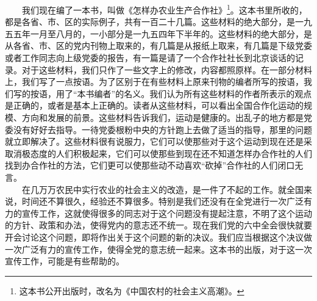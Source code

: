 \documentclass[cn,11pt,chinese]{elegantbook}
\begin{document}
　　我们现在编了一本书，叫做《怎样办农业生产合作社》\footnote[1]{ 这本书公开出版时，改名为《中国农村的社会主义高潮》。}。这本书里所收的，都是各省、市、区的实际例子，共有一百二十几篇。这些材料的绝大部分，是一九五五年一月至八月的，一小部分是一九五四年下半年的。这些材料的绝大部分，是从各省、市、区的党内刊物上取来的，有几篇是从报纸上取来，有几篇是下级党委或者工作同志向上级党委的报告，有一篇是请了一个合作社社长到北京谈话的记录。对于这些材料，我们只作了一些文字上的修改，内容都照原样。在一部分材料上，我们写了一点按语。为了区别于在有些材料上原来刊物的编者所写的按语，我们写的按语，用了“本书编者”的名义。我们认为所有这些材料的作者所表示的观点是正确的，或者是基本上正确的。读者从这些材料，可以看出全国合作化运动的规模、方向和发展的前景。这些材料告诉我们，运动是健康的。出乱子的地方都是党委没有好好去指导。一待党委根粉中央的方针跑上去做了适当的指导，那里的问题就立即解决了。这些材料很有说服力，它们可以使那些对于这个运动到现在还是采取消极态度的人们积极起来，它们可以使那些到现在还不知道怎样办合作社的人们找到办合作社的方法，它们更可以使那些动不动喜欢“砍掉”合作社的人们闭口无言。\\
　　在几万万农民中实行农业的社会主义的改造，是一件了不起的工作。就全国来说，时间还不算很久，经验还不算很多。特别是我们还没有在全党进行一次广泛有力的宣传工作，这就使得很多的同志对于这个问题没有提起注意，不明了这个运动的方针、政策和办法，使得党内的意志还不统一。现在我们党的六中全会很快就要开会讨论这个问题，即将作出关于这个问题的新的决议。我们应当根据这个决议做一次广泛有力的宣传工作，使得全党的意志统一起来。这本书的出版，对于这一次宣传工作，可能是有些帮助的。\\
\end{document}
